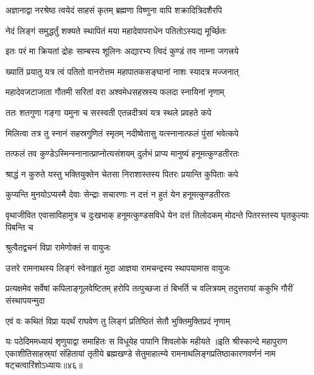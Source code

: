 
\twolineshloka
{अज्ञानाद्वा नरश्रेष्ठ त्वयेदं साहसं कृतम्}
{ब्रह्मणा विष्णुना वापि शक्रादित्रिदशैरपि}%

\twolineshloka
{नेदं लिङ्गं समुद्धर्तुं शक्यते स्थापितं मया}
{महादेवापराधेन पतितोऽस्यद्य मूर्च्छितः}%

\twolineshloka
{इतः परं मा क्रियतां द्रोहः साम्बस्य शूलिनः}
{अद्यारभ्य त्विदं कुण्डं तव नाम्ना जगत्त्रये}%

\twolineshloka
{ख्यातिं प्रयातु यत्र त्वं पतितो वानरोत्तम}
{महापातकसङ्घानां नाशः स्यादत्र मज्जनात्}%

\twolineshloka
{महादेवजटाजाता गौतमी सरितां वरा}
{अश्वमेधसहस्रस्य फलदा स्नायिनां नृणाम्}%

\twolineshloka
{ततः शतगुणा गङ्गा यमुना च सरस्वती}
{एतन्नदीत्रयं यत्र स्थले प्रवहते कपे}%

\twolineshloka
{मिलित्वा तत्र तु स्नानं सहस्रगुणितं स्मृतम्}
{नदीष्वेतासु यत्स्नानात्फलं पुंसां भवेत्कपे}%

\twolineshloka
{तत्फलं तव कुण्डेऽस्मिन्स्नानात्प्राप्नोत्यसंशयम्}
{दुर्लभं प्राप्य मानुष्यं हनूमत्कुण्डतीरतः}%

\twolineshloka
{श्राद्धं न कुरुते यस्तु भक्तियुक्तेन चेतसा}
{निराशास्तस्य पितरः प्रयान्ति कुपिताः कपे}%

\twolineshloka
{कुप्यन्ति मुनयोऽप्यस्मै देवाः सेन्द्राः सचारणाः}
{न दत्तं न हुतं येन हनूमत्कुण्डतीरतः}%

\threelineshloka
{वृथाजीवित एवासाविहामुत्र च दुःखभाक्}
{हनूमत्कुण्डसविधे येन दत्तं तिलोदकम्}
{मोदन्ते पितरस्तस्य घृतकुल्याः पिबन्ति च}%



\onelineshloka
{श्रुत्वैतद्वचनं विप्रा रामेणोक्तं स वायुजः}%

\twolineshloka
{उत्तरे रामनाथस्य लिङ्गं स्वेनाहृतं मुदा}
{आज्ञया रामचन्द्रस्य स्थापयामास वायुजः}%

\threelineshloka
{प्रत्यक्षमेव सर्वेषां कपिलाङ्गूलवेष्टितम्}
{हरोपि तत्पुच्छजा तं बिभर्ति च वलित्रयम्}
{तदुत्तरायां ककुभि गौरीं संस्थापयन्मुदा}%


\twolineshloka
{एवं वः कथितं विप्रा यदर्थं राघवेण तु}
{लिङ्गं प्रतिष्ठितं सेतौ भुक्तिमुक्तिप्रदं नृणाम्}%

\twolineshloka
{यः पठेदिममध्यायं शृणुयाद्वा समाहितः}
{स विधूयेह पापानि शिवलोके महीयते}%
॥इति श्रीस्कान्दे महापुराण एकाशीतिसाहस्र्यां संहितायां तृतीये ब्रह्मखण्डे सेतुमाहात्म्ये रामनाथलिङ्गप्रतिष्ठाकारणवर्णनं नाम षट्चत्वारिंशोऽध्यायः॥४६॥


